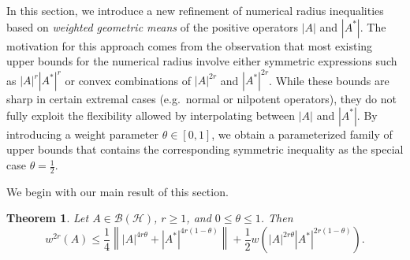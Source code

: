 \documentclass[final,1p,times]{elsarticle}
\newtheorem{thm}{Theorem}[section]
\begin{document}
In this section, we introduce a new refinement of numerical radius inequalities
based on \emph{weighted geometric means} of the positive operators $|A|$ and
$|A^*|$.  
The motivation for this approach comes from the observation that most existing
upper bounds for the numerical radius involve either symmetric expressions such
as $|A|^r|A^*|^r$ or convex combinations of $|A|^{2r}$ and $|A^*|^{2r}$.  
While these bounds are sharp in certain extremal cases (e.g.\ normal or
nilpotent operators), they do not fully exploit the flexibility allowed by
interpolating between $|A|$ and $|A^*|$. By introducing a weight parameter $\theta\in[0,1]$, we obtain a
parameterized family of upper bounds that contains the corresponding symmetric inequality as the special case $\theta=\frac12$.

\medskip

We begin with our main result of this section.

\begin{thm}\label{thm:main}
Let $A\in\mathcal{B}(\mathcal{H})$, $r\geq 1$, and
$0\leq \theta\leq 1$. Then
\[
w^{2r}(A)
\leq
\frac14
\left\|
|A|^{4r\theta}
+
|A^*|^{4r(1-\theta)}
\right\|
+
\frac12
w\!\left(
|A|^{2r\theta}
|A^*|^{2r(1-\theta)}
\right).
\]
\end{thm}
\end{document}
